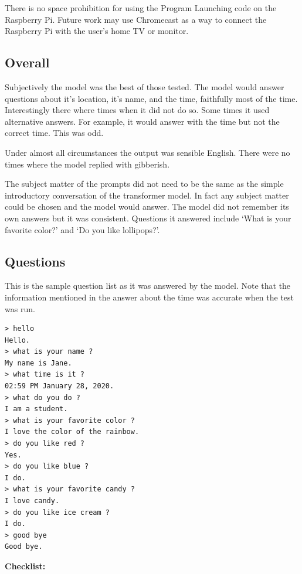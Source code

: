 There is no space prohibition for using the Program Launching code on the Raspberry Pi. Future work may use Chromecast as a way to connect the Raspberry Pi with the user's home TV or monitor. 

\subsection{Overall}

Subjectively the model was the best of those tested. The model would answer questions about it's location, it's name, and the time, faithfully most of the time. Interestingly there where times when it did not do so. Some times it used alternative answers. For example, it would answer with the time but not the correct time. This was odd.

Under almost all circumstances the output was sensible English. There were no times where the model replied with gibberish. 

The subject matter of the prompts did not need to be the same as the simple introductory conversation of the transformer model. In fact any subject matter could be chosen and the model would answer. The model did not remember its own answers but it was consistent. Questions it answered include `What is your favorite color?' and `Do you like lollipops?'. 

\subsection*{Questions}
This is the sample question list as it was answered by the model. Note that the information mentioned in the answer about the time was accurate when the test was run.

\begin{verbatim}
> hello
Hello.
> what is your name ?
My name is Jane.
> what time is it ?
02:59 PM January 28, 2020.
> what do you do ?
I am a student.
> what is your favorite color ?
I love the color of the rainbow.
> do you like red ?
Yes.
> do you like blue ?
I do.
> what is your favorite candy ?
I love candy.
> do you like ice cream ?
I do. 
> good bye
Good bye.
\end{verbatim}

\noindent \textbf{Checklist:} 

